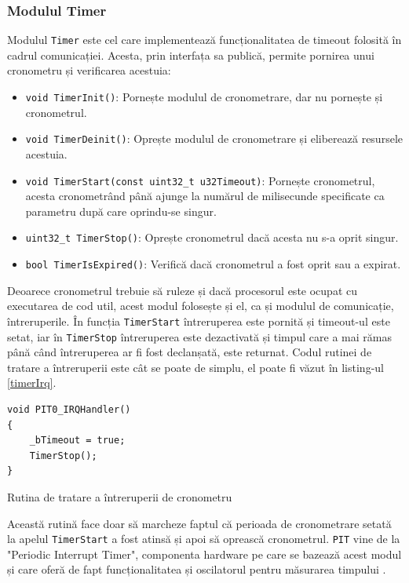 \documentclass[12pt,a4paper,titlepage]{report}
\begin{document}
\subsubsection{Modulul Timer}
Modulul \texttt{Timer} este cel care implementează funcționalitatea de timeout folosită în cadrul comunicației.
Acesta, prin interfața sa publică, permite pornirea unui cronometru și verificarea acestuia:

\begin{itemize}
\item \texttt{void TimerInit()}: Pornește modulul de cronometrare, dar nu pornește și cronometrul.
\item \texttt{void TimerDeinit()}: Oprește modulul de cronometrare și eliberează resursele acestuia.
\item \texttt{void TimerStart(const uint32\_t u32Timeout)}: Pornește cronometrul, acesta cronometrând până ajunge la numărul de milisecunde specificate ca parametru după care oprindu-se singur.
\item \texttt{uint32\_t TimerStop()}: Oprește cronometrul dacă acesta nu s-a oprit singur.
\item \texttt{bool TimerIsExpired()}: Verifică dacă cronometrul a fost oprit sau a expirat.
\end{itemize}

Deoarece cronometrul trebuie să ruleze și dacă procesorul este ocupat cu executarea de cod util, acest modul folosește și el, ca și modulul de comunicație, întreruperile. În funcția \texttt{TimerStart} întreruperea este pornită și timeout-ul este setat, iar în \texttt{TimerStop} întreruperea este dezactivată și timpul care a mai rămas până când întreruperea ar fi fost declanșată, este returnat. Codul rutinei de tratare a întreruperii este cât se poate de simplu, el poate fi văzut în listing-ul \ref{timerIrq}.

\begin{listing}[h]
\begin{verbatim}
void PIT0_IRQHandler()
{
    _bTimeout = true;
    TimerStop();
}
\end{verbatim}

\caption{Rutina de tratare a întreruperii de cronometru}
\label{timerIrq}
\end{listing}

Această rutină face doar să marcheze faptul că perioada de cronometrare setată la apelul \texttt{TimerStart} a fost atinsă și apoi să oprească cronometrul. \texttt{PIT} vine de la "Periodic Interrupt Timer", componenta hardware pe care se bazează acest modul și care oferă de fapt funcționalitatea și oscilatorul pentru măsurarea timpului \cite{kv5x}.
\end{document}
